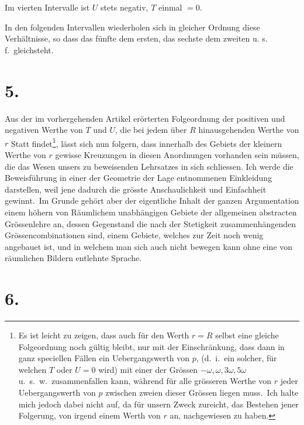 \documentclass[12pt,a4paper]{article}
\theoremstyle{plain}
\begin{document}
Im vierten Intervalle ist $U$ stets negativ, $T$ einmal $= 0$.

In den folgenden Intervallen wiederholen sich in gleicher Ordnung diese
Verhältnisse, so dass das fünfte dem ersten, das sechste dem zweiten u. s. f.\  gleichsteht.

\section*{5.}

Aus der im vorhergehenden Artikel erörterten Folgeordnung der positiven
und negativen Werthe von $T$ und $U$, die bei jedem über $R$ hinausgehenden
Werthe von $r$ Statt findet\footnote{Es ist leicht zu zeigen, dass auch für den Werth $r = R$ selbst eine gleiche Folgeordnung noch
gültig bleibt, nur mit der Einschränkung, dass dann in ganz speciellen Fällen ein Uebergangswerth von $p$,
(d.\ i.\ ein solcher, für welchen $T$ oder $U = 0$ wird) mit einer der Grössen $-\omega, \omega, 3\omega, 5\omega$ u.\ s.\ w.\ zusammenfallen kann, während für alle grösseren Werthe von $r$ jeder Uebergangswerth von $p$ zwischen zweien dieser Grössen liegen muss.\ Ich halte mich jedoch dabei nicht auf, da für unsern Zweck zureicht, das Bestehen
jener Folgerung, von irgend einem Werth von $r$ an, nachgewiesen zu haben.}, lässt sich nun folgern, dass innerhalb des Gebiets
der kleinern Werthe von $r$ gewisse Kreuzungen in diesen Anordnungen vorhanden
sein müssen, die das Wesen unsers zu beweisenden Lehrsatzes in sich schliessen.
Ich werde die Beweisführung in einer der Geometrie der Lage entnommenen Einkleidung darstellen, weil jene dadurch die grösste Anschaulichkeit und Einfachheit gewinnt.\ Im Grunde gehört aber der eigentliche Inhalt der ganzen Argumentation einem höhern von Räumlichem unabhängigen Gebiete der allgemeinen
abstracten Grössenlehre an, dessen Gegenstand die nach der Stetigkeit zusammenhängenden Grössencombinationen sind, einem Gebiete, welches zur Zeit noch
wenig angebauet ist, und in welchem man sich auch nicht bewegen kann ohne
eine von räumlichen Bildern entlehnte Sprache.

\section*{6.}
\end{document}
